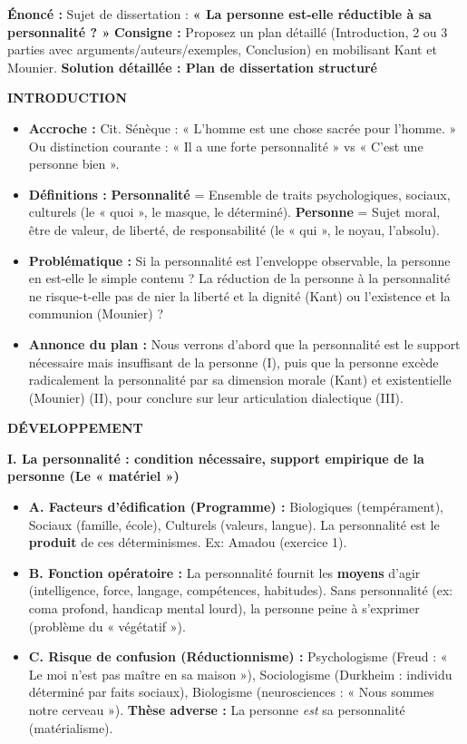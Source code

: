 \documentclass[11pt]{article}
\begin{document}
\begin{exoresolu}
\textbf{Énoncé :} Sujet de dissertation : \textbf{« La personne est-elle réductible à sa personnalité ? »}
\textbf{Consigne :} Proposez un plan détaillé (Introduction, 2 ou 3 parties avec arguments/auteurs/exemples, Conclusion) en mobilisant Kant et Mounier.
\tcblower
\textbf{Solution détaillée : Plan de dissertation structuré}

\textbf{INTRODUCTION}
\begin{itemize}
    \item \textbf{Accroche :} Cit. Sénèque : « L'homme est une chose sacrée pour l'homme. » Ou distinction courante : « Il a une forte personnalité » vs « C'est une personne bien ».
    \item \textbf{Définitions :} \textbf{Personnalité} = Ensemble de traits psychologiques, sociaux, culturels (le « quoi », le masque, le déterminé). \textbf{Personne} = Sujet moral, être de valeur, de liberté, de responsabilité (le « qui », le noyau, l'absolu).
    \item \textbf{Problématique :} Si la personnalité est l'enveloppe observable, la personne en est-elle le simple contenu ? La réduction de la personne à la personnalité ne risque-t-elle pas de nier la liberté et la dignité (Kant) ou l'existence et la communion (Mounier) ?
    \item \textbf{Annonce du plan :} Nous verrons d'abord que la personnalité est le support nécessaire mais insuffisant de la personne (I), puis que la personne excède radicalement la personnalité par sa dimension morale (Kant) et existentielle (Mounier) (II), pour conclure sur leur articulation dialectique (III).
\end{itemize}

\textbf{DÉVELOPPEMENT}

\textbf{I. La personnalité : condition nécessaire, support empirique de la personne (Le « matériel »)}
\begin{itemize}
    \item \textbf{A. Facteurs d'édification (Programme) :} Biologiques (tempérament), Sociaux (famille, école), Culturels (valeurs, langue). La personnalité est le \textbf{produit} de ces déterminismes. Ex: Amadou (exercice 1).
    \item \textbf{B. Fonction opératoire :} La personnalité fournit les \textbf{moyens} d'agir (intelligence, force, langage, compétences, habitudes). Sans personnalité (ex: coma profond, handicap mental lourd), la personne peine à s'exprimer (problème du « végétatif »).
    \item \textbf{C. Risque de confusion (Réductionnisme) :} Psychologisme (Freud : « Le moi n'est pas maître en sa maison »), Sociologisme (Durkheim : individu déterminé par faits sociaux), Biologisme (neurosciences : « Nous sommes notre cerveau »). \textbf{Thèse adverse :} La personne \emph{est} sa personnalité (matérialisme).
\end{itemize}


\end{exoresolu}
\end{document}
